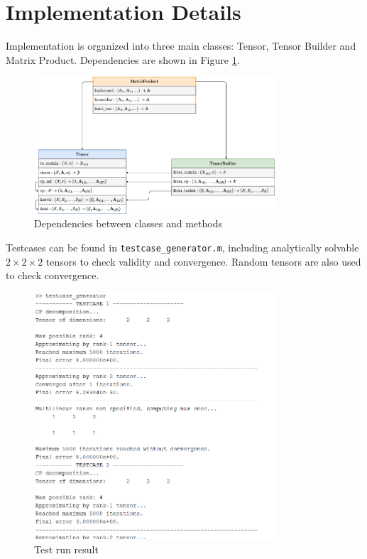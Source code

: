 \section{Implementation Details}

Implementation is organized into three main classes: Tensor, Tensor Builder and Matrix Product. Dependencies are shown in Figure \ref{fig:dependencies}.

\begin{figure}
    \centering
    \includegraphics[width=0.8\textwidth]{img/dependency.png}
    \caption{Dependencies between classes and methods}
    \label{fig:dependencies}
\end{figure}

Testcases can be found in \texttt{testcase\_generator.m}, including analytically solvable $2\times2\times2$ tensors to check validity and convergence. Random tensors are also used to check convergence.

\begin{figure}
    \centering
    \includegraphics[width=0.8\textwidth]{img/testcases.png}
    \caption{Test run result}
    \label{fig:test}
\end{figure}
